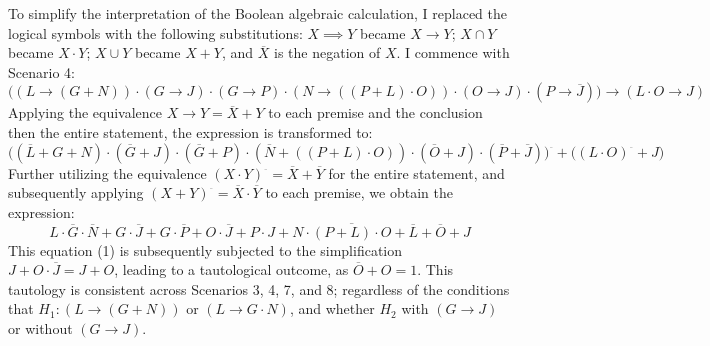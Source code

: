 To simplify the interpretation of the Boolean algebraic calculation, I replaced the logical symbols with the following substitutions: \(X \implies Y\) became \(X \to Y\); \(X \cap Y\) became \(X \cdot Y\); \(X \cup Y\) became \(X + Y\), and \(\overline{X}\) is the negation of \(X\). I commence with Scenario 4:
\[
\big((L \to (G + N)) \cdot (G \to J) \cdot (G \to P) \cdot (N \to ((P + L) \cdot O)) \cdot (O \to J) \cdot (P \to \overline{J})\big) \to (L \cdot O \to J)
\]
Applying the equivalence \(X \to Y = \overline{X} + Y\) to each premise and the conclusion then the entire statement, the expression is transformed to:
\[
\big((\overline{L} + G + N) \cdot (\overline{G} + J) \cdot (\overline{G} + P) \cdot (\overline{N} + ((P + L) \cdot O)) \cdot (\overline{O} + J) \cdot (\overline{P} + \overline{J})\big)^{\overline{}} + \big((L \cdot O)^{\overline{}} + J\big)
\]
Further utilizing the equivalence \((X \cdot Y)^{\overline{}} = \overline{X} + \overline{Y}\) for the entire statement, and subsequently applying \((X + Y)^{\overline{}} = \overline{X} \cdot \overline{Y}\) to each premise, we obtain the expression:
\[
L \cdot \overline{G} \cdot \overline{N} + G \cdot \overline{J} + G \cdot \overline{P} + O \cdot \overline{J} + P \cdot J + N \cdot \overline{(P + L) \cdot O} + \overline{L} + \overline{O} + J \tag{1}
\]
This equation (1) is subsequently subjected to the simplification \(J + O \cdot \overline{J} = J + O\), leading to a tautological outcome, as \(\overline{O} + O = 1\). This tautology is consistent across Scenarios 3, 4, 7, and 8; regardless of the conditions that \(H_1: (L \to (G + N))\) or \((L \to G \cdot N)\), and whether \(H_2\) with \((G \to J)\) or without \((G \to J)\).

